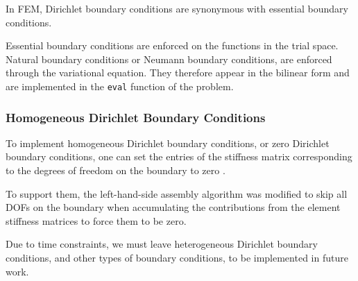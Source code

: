 In FEM, Dirichlet boundary conditions are synonymous with essential boundary conditions.

Essential boundary conditions are enforced on the functions in the trial space.
Natural boundary conditions or Neumann boundary conditions, are enforced through the variational equation.
They therefore appear in the bilinear form and are implemented in the \texttt{eval} function of the problem.


\subsubsection{Homogeneous Dirichlet Boundary Conditions}

To implement homogeneous Dirichlet boundary conditions, or zero Dirichlet boundary conditions,
one can set the entries of the stiffness matrix corresponding to the degrees of freedom on the boundary to zero
\cite[Chapter~2.7.6]{hiptmair_numerical_2023}.

To support them, the left-hand-side assembly algorithm was modified to skip all DOFs on the boundary when accumulating the contributions
from the element stiffness matrices to force them to be zero.

Due to time constraints, we must leave heterogeneous Dirichlet boundary conditions,
and other types of boundary conditions, to be implemented in future work.
